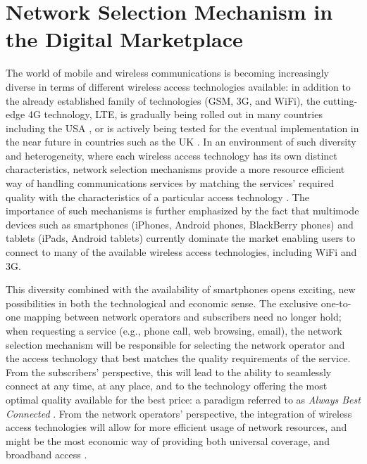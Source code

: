 \chapter{Network Selection Mechanism in the Digital Marketplace} %
\label{cha:network_selection_mechanism_in_the_digital_marketplace}

\minitoc
\vspace{10mm}

The world of mobile and wireless communications is becoming increasingly diverse in terms of different wireless access technologies available: in addition to the already established family of technologies (GSM, 3G, and WiFi), the cutting-edge 4G technology, LTE, is gradually being rolled out in many countries including the USA \cite{VerizonLTEUSA}, or is actively being tested for the eventual implementation in the near future in countries such as the UK \cite{BBCLTEUK}. In an environment of such diversity and heterogeneity, where each wireless access technology has its own distinct characteristics, network selection mechanisms provide a more resource efficient way of handling communications services by matching the services' required quality with the characteristics of a particular access technology \cite{HossainBeaubrun09, HossainTalebiFard09}. The importance of such mechanisms is further emphasized by the fact that multimode devices such as smartphones (iPhones, Android phones, BlackBerry phones) and tablets (iPads, Android tablets) currently dominate the market enabling users to connect to many of the available wireless access technologies, including WiFi and 3G.

This diversity combined with the availability of smartphones opens exciting, new possibilities in both the technological and economic sense. The exclusive one-to-one mapping between network operators and subscribers need no longer hold; when requesting a service (e.g., phone call, web browsing, email), the network selection mechanism will be responsible for selecting the network operator and the access technology that best matches the quality requirements of the service. From the subscribers' perspective, this will lead to the ability to seamlessly connect at any time, at any place, and to the technology offering the most optimal quality available for the best price: a paradigm referred to as \emph{Always Best Connected} \cite{ABC03}. From the network operators' perspective, the integration of wireless access technologies will allow for more efficient usage of network resources, and might be the most economic way of providing both universal coverage, and broadband access \cite{HossainBeaubrun09}.

